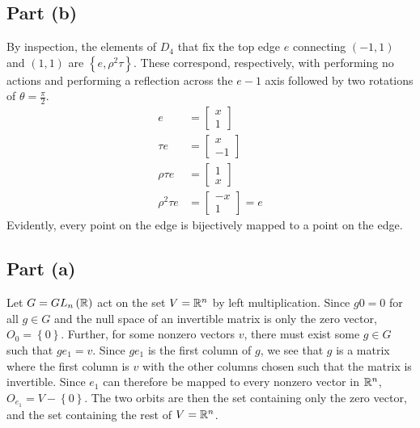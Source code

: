 \documentclass{article}
\begin{document}
\subsection*{Part (b)}
By inspection, the elements of $D_4$ that fix the top edge $e$ connecting $\left(-1, 1\right)$ and $\left(1, 1\right)$ are $\left\{e, \rho^2\tau\right\}$. These correspond, respectively, with performing no actions and performing a reflection across the $e-1$ axis followed by two rotations of $\theta = \frac{\pi}{2}$.
\begin{equation}
    \begin{split}
        e & = \begin{bmatrix} x \\ 1 \end{bmatrix} \\
        \tau e & = \begin{bmatrix} x \\ -1 \end{bmatrix} \\
        \rho\tau e & = \begin{bmatrix} 1 \\ x \end{bmatrix} \\
        \rho^2\tau e & = \begin{bmatrix} -x \\ 1 \end{bmatrix} =  e
    \end{split}
\end{equation}
Evidently, every point on the edge is bijectively mapped to a point on the edge.

\newpage

\subsection*{Part (a)}
Let $G = GL_n\left(\mathbb{R}\right)$ act on the set $V = \mathbb{R}^n$ by left multiplication. Since $g0 = 0$ for all $g \in G$ and the null space of an invertible matrix is only the zero vector, $O_0 = \left\{0\right\}$. Further, for some nonzero vectors $v$, there must exist some $g \in G$ such that $ge_1 = v$. Since $ge_1$ is the first column of $g$, we see that $g$ is a matrix where the first column is $v$ with the other columns chosen such that the matrix is invertible. Since $e_1$ can therefore be mapped to every nonzero vector in $\mathbb{R}^n$, $O_{e_1} = V - \left\{0\right\}$. The two orbits are then the set containing only the zero vector, and the set containing the rest of $V = \mathbb{R}^n$.
\end{document}
